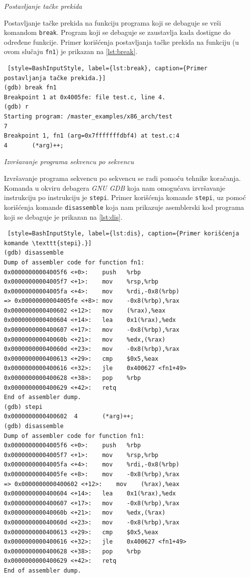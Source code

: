 \documentclass[12pt,oneside]{memoir}
\begin{document}
\begin{description}

\item{\emph{Postavljanje tačke prekida}}

Postavljanje tačke prekida na funkciju programa koji se debaguje se vrši komandom \texttt{break}. Program koji se debaguje se zaustavlja kada dostigne do određene funkcije. Primer korišćenja postavljanja tačke prekida na funkciju (u ovom slučaju \texttt{fn1}) je prikazan na \ref{lst:break}.

\begin{lstlisting} [style=BashInputStyle, label={lst:break}, caption={Primer postavljanja tačke prekida.}]
(gdb) break fn1
Breakpoint 1 at 0x4005fe: file test.c, line 4.
(gdb) r
Starting program: /master_examples/x86_arch/test 
7
Breakpoint 1, fn1 (arg=0x7fffffffdbf4) at test.c:4
4		(*arg)++;
\end{lstlisting}

\item{\emph{Izvršavanje programa sekvencu po sekvencu}}

Izvršavanje programa sekvencu po sekvencu se radi pomoću tehnike koračanja. Komanda u okviru debagera \emph{GNU GDB} koja nam omogućava izvršavanje instrukciju po instrukciju je \texttt{stepi}. Primer korišćenja komande \texttt{stepi}, uz pomoć korišćenja komande \texttt{disassemble} koja nam prikazuje asemblerski kod programa koji se debaguje je prikazan na \ref{lst:dis}.\newpage

\begin{lstlisting} [style=BashInputStyle, label={lst:dis}, caption={Primer korišćenja komande \texttt{stepi}.}]
(gdb) disassemble
Dump of assembler code for function fn1:
0x00000000004005f6 <+0>:	push   %rbp
0x00000000004005f7 <+1>:	mov    %rsp,%rbp
0x00000000004005fa <+4>:	mov    %rdi,-0x8(%rbp)
=> 0x00000000004005fe <+8>:	mov    -0x8(%rbp),%rax
0x0000000000400602 <+12>:	mov    (%rax),%eax
0x0000000000400604 <+14>:	lea    0x1(%rax),%edx
0x0000000000400607 <+17>:	mov    -0x8(%rbp),%rax
0x000000000040060b <+21>:	mov    %edx,(%rax)
0x000000000040060d <+23>:	mov    -0x8(%rbp),%rax
0x0000000000400613 <+29>:	cmp    $0x5,%eax
0x0000000000400616 <+32>:	jle    0x400627 <fn1+49>
0x0000000000400628 <+38>:	pop    %rbp
0x0000000000400629 <+42>:	retq   
End of assembler dump.
(gdb) stepi
0x0000000000400602	4		(*arg)++;
(gdb) disassemble 
Dump of assembler code for function fn1:
0x00000000004005f6 <+0>:	push   %rbp
0x00000000004005f7 <+1>:	mov    %rsp,%rbp
0x00000000004005fa <+4>:	mov    %rdi,-0x8(%rbp)
0x00000000004005fe <+8>:	mov    -0x8(%rbp),%rax
=> 0x0000000000400602 <+12>:	mov    (%rax),%eax
0x0000000000400604 <+14>:	lea    0x1(%rax),%edx
0x0000000000400607 <+17>:	mov    -0x8(%rbp),%rax
0x000000000040060b <+21>:	mov    %edx,(%rax)
0x000000000040060d <+23>:	mov    -0x8(%rbp),%rax
0x0000000000400613 <+29>:	cmp    $0x5,%eax
0x0000000000400616 <+32>:	jle    0x400627 <fn1+49>
0x0000000000400628 <+38>:	pop    %rbp
0x0000000000400629 <+42>:	retq   
End of assembler dump.
\end{lstlisting}


\end{description}
\end{document}
